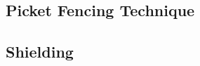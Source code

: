\documentclass[12pt,openany,a4paper]{book}
\begin{document}
\subsection{Picket Fencing Technique}	\label{sec:picket}


\subsection{Shielding}









%
% 
%
%
%
%
%
%
%
%
%
% 






\end{document}
